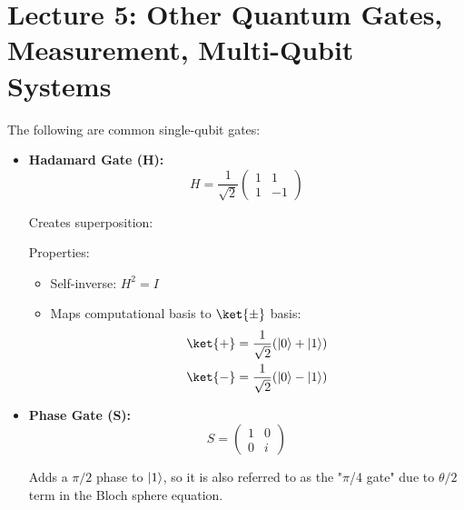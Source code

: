\section{Lecture 5: Other Quantum Gates, Measurement, Multi-Qubit Systems}
\label{sec:lecture5}


The following are common single-qubit gates:

\begin{itemize}
  \item \textbf{Hadamard Gate (H):}
    \[
      \boxed{
        H = \frac{1}{\sqrt{2}} \begin{pmatrix} 1 & 1 \\ 1 & -1 \end{pmatrix}
      }
    \]

    Creates superposition: 

    \vspace{0.3cm}

    Properties:

    \begin{itemize}
      \item Self-inverse: $H^2 = I$
      \item Maps computational basis to $\ket{\pm}$ basis:
        \begin{align*}
          \ket{+} &= \frac{1}{\sqrt{2}}(\zero + \one) \\
          \ket{-} &= \frac{1}{\sqrt{2}}(\zero - \one)
        \end{align*}
    \end{itemize}

    \nt{
      \[
        H \zero = \ket{+}, \quad H \one = \ket{-}, \quad H \ket{+} = \zero,
        \quad H \ket{-} = \one
      \]
    }

  \item \textbf{Phase Gate (S):}
    \[
      \boxed{
        S = \begin{pmatrix} 1 & 0 \\ 0 & i \end{pmatrix}
      }
    \]

    Adds a $\pi/2$ phase to $\left|1\right\rangle$, so it is also referred to as the "$\pi$/4
    gate" due to $\theta/2$ term in the Bloch sphere equation.


\end{itemize}
